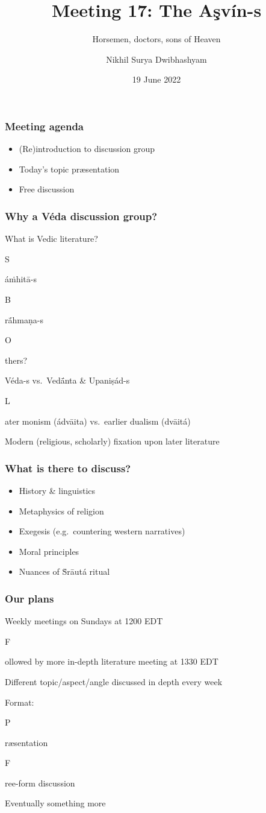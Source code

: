 \documentclass[pdf]{beamer}
\title{Meeting 17: The Aşvín-s}
\subtitle{Horsemen, doctors, sons of Heaven}
\author{Nikhil Surya Dwibhashyam}
\date{19 June 2022}
\newcommand{\Subitem}[1]{{\setlength\itemindent{12pt} \item[-] #1}}
\begin{document}
\frame{\titlepage}

\begin{frame} \frametitle{Meeting agenda}
\begin{itemize}
	\item (Re)introduction to discussion group
	\item Today's topic præsentation
	\item Free discussion
\end{itemize}
\end{frame}

\begin{frame} \frametitle{Why a Véda discussion group?}
\begin{itemize}
	\item What is Vedic literature?
	\Subitem Sáṁhitā-s
	\Subitem Brā́hmaṇa-s
	\Subitem Others?
	\item Véda-s vs.~Vedā́nta \& Upaniṣád-s
	\Subitem Later monism (ádvāita) vs.~earlier dualism (dvāitá)
	\item Modern (religious, scholarly) fixation upon later literature
\end{itemize}
\end{frame}

\begin{frame} \frametitle{What is there to discuss?}
\begin{itemize}
	\item History \& linguistics
	\item Metaphysics of religion
	\item Exegesis (e.g.~countering western narratives)
	\item Moral principles
	\item Nuances of Ṡrāutá ritual
\end{itemize}
\end{frame}

\begin{frame} \frametitle{Our plans}
\begin{itemize}
	\item Weekly meetings on Sundays at 1200 EDT
	\Subitem Followed by more in-depth literature meeting at 1330 EDT
	\item Different topic/aspect/angle discussed in depth every week
	\item Format:
	\Subitem Præsentation
	\Subitem Free-form discussion
	\item Eventually something more
\end{itemize}
\end{frame}
\end{document}
